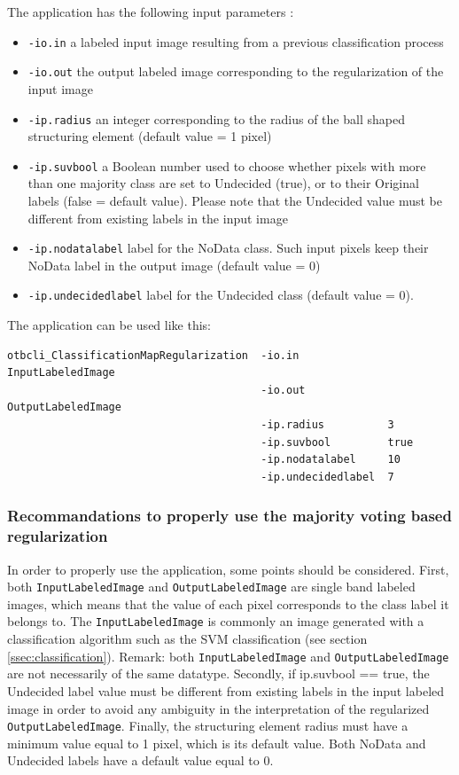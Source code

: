 The  application has the following input parameters :
\begin{itemize}
\item \verb?-io.in? a labeled input image resulting from a previous classification process
\item \verb?-io.out? the output labeled image corresponding to the regularization of the input image
\item \verb?-ip.radius? an integer corresponding to the radius of the ball shaped structuring element (default value = 1 pixel)
\item \verb?-ip.suvbool? a Boolean number used to choose whether pixels with more than one majority class are set to Undecided (true),
or to their Original labels (false = default value). Please note that the Undecided value must be different from existing labels in the input image
\item \verb?-ip.nodatalabel? label for the NoData class. Such input pixels keep their NoData label in the output image (default value = 0)
\item \verb?-ip.undecidedlabel? label for the Undecided class (default value = 0).
\end{itemize}


The application can be used like this:
\begin{verbatim}
otbcli_ClassificationMapRegularization  -io.in              InputLabeledImage
                                        -io.out             OutputLabeledImage
                                        -ip.radius          3
                                        -ip.suvbool         true
                                        -ip.nodatalabel     10
                                        -ip.undecidedlabel  7
\end{verbatim}
 

\subsubsection{Recommandations to properly use the majority voting based regularization}

In order to properly use the  application, some points should be considered.
First, both \verb?InputLabeledImage? and \verb?OutputLabeledImage? are single band labeled images, which means that the
value of each pixel corresponds to the class label it belongs to. The \verb?InputLabeledImage? is commonly an image generated
with a classification algorithm such as the SVM classification (see section \ref{ssec:classification}). Remark: both
\verb?InputLabeledImage? and \verb?OutputLabeledImage? are not necessarily of the same datatype. Secondly, if ip.suvbool == true,
the Undecided label value must be different from existing labels in the input labeled image in order to avoid any ambiguity in the
interpretation of the regularized \verb?OutputLabeledImage?. Finally, the structuring element radius must have a minimum value equal to 1 pixel,
which is its default value. Both NoData and Undecided labels have a default value equal to 0.



